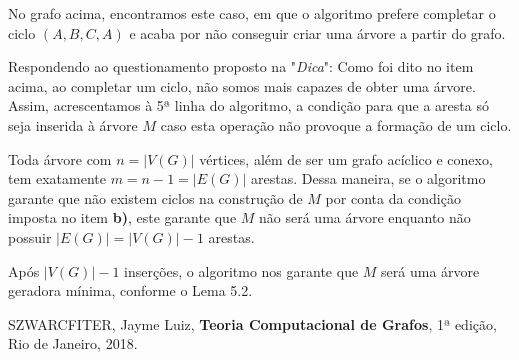 \documentclass{homework}
\begin{document}
	No grafo acima, encontramos este caso, em que o algoritmo prefere completar o ciclo $(A, B, C, A)$ e acaba por não conseguir criar uma árvore a partir do grafo.
	
	
	\subsubquest Respondendo ao questionamento proposto na "\textit{Dica}": Como foi dito no item acima, ao completar um ciclo, não somos mais capazes de obter uma árvore. Assim, acrescentamos à 5ª linha do algoritmo, a condição para que a aresta só seja inserida à árvore $M$ caso esta operação não provoque a formação de um ciclo.
	
	\subsubquest Toda árvore com $n = |V(G)|$ vértices, além de ser um grafo acíclico e conexo, tem exatamente $m = n - 1 = |E(G)|$ arestas. Dessa maneira, se o algoritmo garante que não existem ciclos na construção de $M$ por conta da condição imposta no item \textbf{b)}, este garante que $M$ não será uma árvore enquanto não possuir $|E(G)| = |V(G)| - 1$ arestas.\par
	
	Após $|V(G)| - 1$ inserções, o algoritmo nos garante que $M$ será uma árvore geradora mínima, conforme o Lema 5.2\cite{jayme:18}.
	
	\quest
	
	\subsubquest

	\subsubquest
	
	\subsubquest
	
	\subsubquest
	
	
	\begin{thebibliography}{10}
		 SZWARCFITER, Jayme Luiz, \textbf{Teoria Computacional de Grafos}, 1ª edição, Rio de Janeiro, 2018.
	\end{thebibliography}
\end{document}
